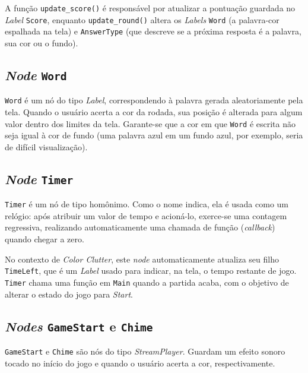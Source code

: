 A função \texttt{update\_score()} é responsável por atualizar a pontuação guardada no \textit{Label} \texttt{Score}, enquanto \texttt{update\_round()} altera os \textit{Labels} \texttt{Word} (a palavra-cor espalhada na tela) e \texttt{AnswerType} (que descreve se a próxima resposta é a palavra, sua cor ou o fundo).


\subsection{\textit{Node} \texttt{Word}}

\texttt{Word} é um nó do tipo \textit{Label}, correspondendo à palavra gerada aleatoriamente pela tela. Quando o usuário acerta a cor da rodada, sua posição é alterada para algum valor dentro dos limites da tela. Garante-se que a cor em que \texttt{Word} é escrita não seja igual à cor de fundo (uma palavra azul em um fundo azul, por exemplo, seria de difícil visualização).


\subsection{\textit{Node} \texttt{Timer}}

\texttt{Timer} é um nó de tipo homônimo. Como o nome indica, ela é usada como um relógio: após atribuir um valor de tempo e acioná-lo, exerce-se uma contagem regressiva, realizando automaticamente uma chamada de função (\textit{callback}) quando chegar a zero.

No contexto de \textit{Color Clutter}, este \textit{node} automaticamente atualiza seu filho \texttt{TimeLeft}, que é um \textit{Label} usado para indicar, na tela, o  tempo restante de jogo. \texttt{Timer} chama uma função em \texttt{Main} quando a partida acaba, com o objetivo de alterar o estado do jogo para \textit{Start}.


\subsection{\textit{Nodes} \texttt{GameStart} e \texttt{Chime}}

\texttt{GameStart} e \texttt{Chime} são nós do tipo \textit{StreamPlayer}. Guardam um efeito sonoro tocado no início do jogo e quando o usuário acerta a cor, respectivamente.

